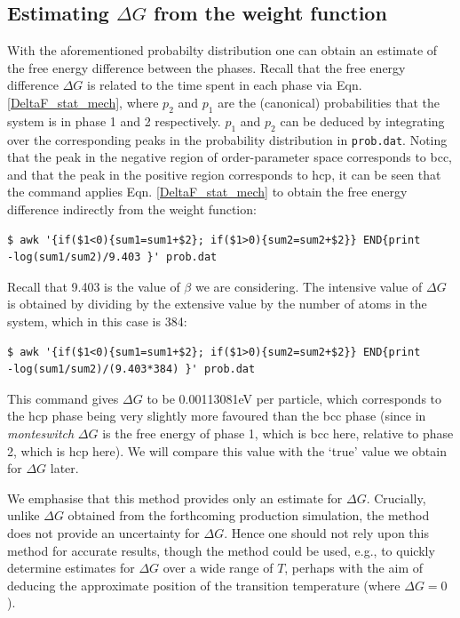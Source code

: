 \documentclass{report}
\begin{document}
\subsection{Estimating $\Delta G$ from the weight function}
With the aforementioned probabilty distribution one can obtain an estimate of the free energy difference between the phases. Recall that the
free energy difference $\Delta G$ is related to the time spent in each phase via Eqn. \eqref{DeltaF_stat_mech}, where $p_2$ and $p_1$ are the (canonical) 
probabilities that the system is in phase 1 and 2 respectively. 
$p_1$ and $p_2$ can be deduced by integrating over the corresponding peaks in the probability distribution in \texttt{prob.dat}. 
Noting that the peak in the negative region of order-parameter space corresponds to bcc, and that the peak in the positive region corresponds to hcp, it
can be seen that the command applies Eqn. \eqref{DeltaF_stat_mech} to obtain the free energy difference indirectly from the weight function:
\begin{verbatim}
$ awk '{if($1<0){sum1=sum1+$2}; if($1>0){sum2=sum2+$2}} END{print
-log(sum1/sum2)/9.403 }' prob.dat
\end{verbatim}
Recall that 9.403 is the value of $\beta$ we are considering.
The intensive value of $\Delta G$ is obtained by dividing by the extensive value by the number of atoms in the system, which in this case is 384:
\begin{verbatim}
$ awk '{if($1<0){sum1=sum1+$2}; if($1>0){sum2=sum2+$2}} END{print
-log(sum1/sum2)/(9.403*384) }' prob.dat
\end{verbatim}
This command gives $\Delta G$ to be 0.00113081eV per particle, which corresponds to the hcp phase being very slightly more favoured than
the bcc phase (since in \emph{monteswitch} $\Delta G$ is the free energy of phase 1, which is bcc here, relative to phase 2, which is hcp here). 
We will compare this value with the `true' value we obtain for $\Delta G$ later.

We emphasise that this method provides only an estimate for $\Delta G$. Crucially, unlike $\Delta G$ obtained from the forthcoming production
simulation, the method does not provide an uncertainty for $\Delta G$. Hence one should not rely upon this method
for accurate results, though the method could be used, e.g., to quickly determine estimates for $\Delta G$ over a wide range of 
$T$, perhaps with the aim of deducing the approximate position of the transition temperature (where $\Delta G=0$).
\end{document}
